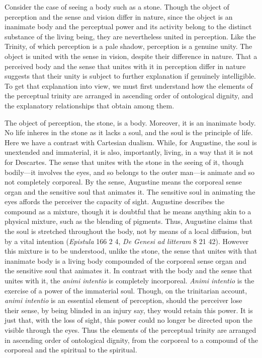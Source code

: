 \documentclass[12pt]{article}
\begin{document}
Consider the case of seeing a body such as a stone. Though the object of perception and the sense and vision differ in nature, since the object is an inanimate body and the perceptual power and its activity belong to the distinct substance of the living being, they are nevertheless united in perception. Like the Trinity, of which perception is a pale shadow, perception is a genuine unity. The object is united with the sense in vision, despite their difference in nature. That a perceived body and the sense that unites with it in perception differ in nature suggests that their unity is subject to further explanation if genuinely intelligible. To get that explanation into view, we must first understand how the elements of the perceptual trinity are arranged in ascending order of ontological dignity, and the explanatory relationships that obtain among them.

The object of perception, the stone, is a body. Moreover, it is an inanimate body. No life inheres in the stone as it lacks a soul, and the soul is the principle of life. Here we have a contrast with Cartesian dualism. While, for Augustine, the soul is unextended and immaterial, it is also, importantly, living, in a way that it is not for Descartes. The sense that unites with the stone in the seeing of it, though bodily---it involves the eyes, and so belongs to the outer man---is animate and so not completely corporeal. By the sense, Augustine means the corporeal sense organ and the sensitive soul that animates it. The sensitive soul in animating the eyes affords the perceiver the capacity of sight. Augustine describes the compound as a mixture, though it is doubtful that he means anything akin to a physical mixture, such as the blending of pigments. Thus, Augustine claims that the soul is stretched throughout the body, not by means of a local diffusion, but by a vital intention (\emph{Epistula} 166 2 4, \emph{De Genesi ad litteram} 8 21 42). However this mixture is to be understood, unlike the stone, the sense that unites with that inanimate body is a living body compounded of the corporeal sense organ and the sensitive soul that animates it. In contrast with the body and the sense that unites with it, the \emph{animi intentio} is completely incorporeal. \emph{Animi intentio} is the exercise of a power of the immaterial soul. Though, on the trinitarian account, \emph{animi intentio} is an essential element of perception, should the perceiver lose their sense, by being blinded in an injury say, they would retain this power. It is just that, with the loss of sight, this power could no longer be directed upon the visible through the eyes. Thus the elements of the perceptual trinity are arranged in ascending order of ontological dignity, from the corporeal to a compound of the corporeal and the spiritual to the spiritual.
\end{document}
